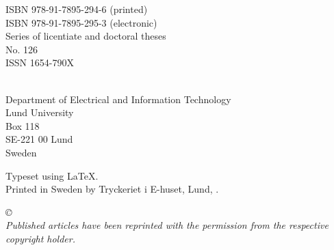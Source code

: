 \documentclass[11pt, twoside, openright]{book}
\theoremstyle{definition}
\newif\ifpaperII %
\begin{document}
\begin{titlepage}
{%
}

\newpage
\thispagestyle{empty}
\begin{flushleft}

ISBN 978-91-7895-294-6 (printed)\\
ISBN 978-91-7895-295-3 (electronic)\\
Series of licentiate and doctoral theses\\
No. 126\\
ISSN 1654-790X\linebreak[2]

\theauthor\\
Department of Electrical and Information Technology\\
Lund University\\
Box 118\\
SE-221 00  Lund\\
Sweden\linebreak[2]


Typeset using \LaTeX.\\

Printed in Sweden by Tryckeriet i E-huset, Lund, \thedate.\linebreak[2]

\textit{\copyright ~\thedate~\theauthor\\
Published articles have been reprinted with the permission from the respective copyright holder.}
\vspace{10mm}
\end{flushleft}
\end{titlepage}
\end{document}
